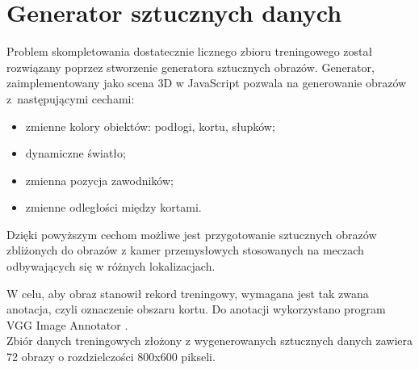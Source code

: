 \newpage
\section{Generator sztucznych danych}
\label{sec:generator}

Problem skompletowania dostatecznie licznego zbioru treningowego został rozwiązany poprzez stworzenie generatora sztucznych obrazów.
Generator, zaimplementowany jako scena 3D w JavaScript pozwala na generowanie obrazów z~następującymi cechami:

\begin{itemize}
	\item zmienne kolory obiektów: podłogi, kortu, słupków;
	\item dynamiczne światło;
	\item zmienna pozycja zawodników;
	\item zmienne odległości między kortami.
\end{itemize}

Dzięki powyższym cechom możliwe jest przygotowanie sztucznych obrazów zbliżonych do obrazów z kamer przemysłowych stosowanych na meczach odbywających się w różnych lokalizacjach.

W celu, aby obraz stanowił rekord treningowy, wymagana jest tak zwana anotacja, czyli oznaczenie obszaru kortu. Do anotacji wykorzystano program VGG Image Annotator \cite{vgg-via}.
\\
Zbiór danych treningowych złożony z wygenerowanych sztucznych danych zawiera 72 obrazy o rozdzielczości 800x600 pikseli.

